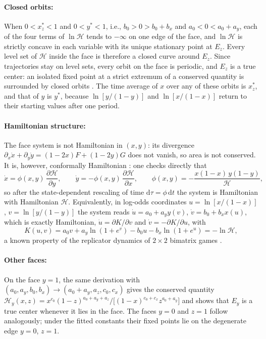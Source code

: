 \documentclass[10pt]{article}
\begin{document}
\begin{appendices}
\paragraph{Closed orbits:} When $0<x_z^*<1$ and $0<y^*<1$, i.e., $b_0>0>b_0+b_x$ and $a_0<0<a_0+a_y$, each of the four terms of $\ln\mathcal{H}$ tends to $-\infty$ on one edge of the face, and $\ln\mathcal{H}$ is strictly concave in each variable with its unique stationary point at $E_z$. Every level set of $\mathcal{H}$ inside the face is therefore a closed curve around $E_z$. Since trajectories stay on level sets, every orbit on the face is periodic, and $E_z$ is a true center: an isolated fixed point at a strict extremum of a conserved quantity is surrounded by closed orbits \cite[Sec.~6.5]{strogatz2024}. The time average of $x$ over any of these orbits is $x_z^*$, and that of $y$ is $y^*$, because $\ln[y/(1-y)]$ and $\ln[x/(1-x)]$ return to their starting values after one period.

\paragraph{Hamiltonian structure:} The face system is not Hamiltonian in $(x,y)$: its divergence $\partial_x\dot x+\partial_y\dot y=(1-2x)F+(1-2y)G$ does not vanish, so area is not conserved. It is, however, conformally Hamiltonian \cite{garcia2020}: one checks directly that
\begin{equation*}
\dot x = \phi(x,y)\,\frac{\partial \mathcal{H}}{\partial y},\qquad \dot y=-\phi(x,y)\,\frac{\partial \mathcal{H}}{\partial x},\qquad \phi(x,y)=-\frac{x(1-x)\,y(1-y)}{\mathcal{H}},
\end{equation*}
so after the state-dependent rescaling of time $\mathrm{d}\tau=\phi\,\mathrm{d} t$ the system is Hamiltonian with Hamiltonian $\mathcal{H}$. Equivalently, in log-odds coordinates $u=\ln[x/(1-x)]$, $v=\ln[y/(1-y)]$ the system reads $\dot u=a_0+a_y y(v)$, $\dot v=b_0+b_x x(u)$, which is exactly Hamiltonian, $\dot u=\partial K/\partial v$ and $\dot v=-\partial K/\partial u$, with
\begin{equation*}
K(u,v) = a_0 v + a_y\ln(1+e^{v}) - b_0 u - b_x\ln(1+e^{u}) = -\ln\mathcal{H},
\end{equation*}
a known property of the replicator dynamics of $2\times2$ bimatrix games \cite{hofbauer1996}.

\paragraph{Other faces:} On the face $y=1$, the same derivation with $(a_0,a_y,b_0,b_x)\to(a_0+a_y,a_z,c_0,c_x)$ gives the conserved quantity $\mathcal{H}_y(x,z)=x^{c_0}(1-z)^{a_0+a_y+a_z}/\big[(1-x)^{c_0+c_x}z^{a_0+a_y}\big]$ and shows that $E_y$ is a true center whenever it lies in the face. The faces $y=0$ and $z=1$ follow analogously; under the fitted constants their fixed points lie on the degenerate edge $y=0$, $z=1$.


\end{appendices}
\end{document}
